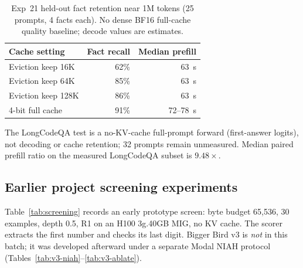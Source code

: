 \documentclass[11pt]{article}
\begin{document}
\begin{table}[ht]
  \centering
  \small
  \caption{Exp~21 held-out fact retention near 1M tokens (25 prompts,
  4 facts each). No dense BF16 full-cache quality baseline; decode values
  are estimates.}
  \label{tab:1m-exp21}
  \begin{tabular}{@{}lrr@{}}
    \toprule
    Cache setting & Fact recall & Median prefill \\
    \midrule
    Eviction keep 16K  & 62\% & 63~s \\
    Eviction keep 64K  & 85\% & 63~s \\
    Eviction keep 128K & 86\% & 63~s \\
    4-bit full cache   & 91\% & 72--78~s \\
    \bottomrule
  \end{tabular}
\end{table}

The LongCodeQA test is a no-KV-cache full-prompt forward (first-answer logits),
not decoding or cache retention; 32 prompts remain unmeasured. Median paired
prefill ratio on the measured LongCodeQA subset is $9.48\times$.

\subsection{Earlier project screening experiments}

Table~\ref{tab:screening} records an early prototype screen: byte budget
65{,}536, 30 examples, depth 0.5, R1 on an H100 3g.40GB MIG, no KV cache.
The scorer extracts the first number and checks its last digit. Bigger Bird
v3 is \emph{not} in this batch; it was developed afterward under a separate
Modal NIAH protocol (Tables~\ref{tab:v3-niah}--\ref{tab:v3-ablate}).
\end{document}
